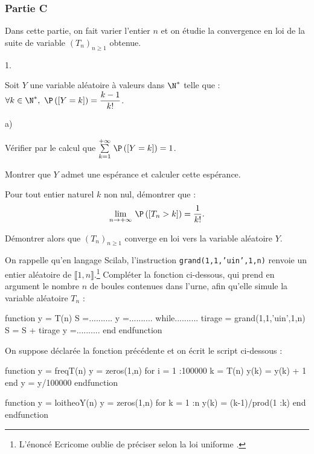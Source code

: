 \documentclass[11pt]{article}%
\begin{document}
{\subsubsection*{Partie C}

Dans cette partie, on fait varier l'entier $n$ et on étudie la
convergence en loi de la suite de variable $(T_{n})_{n\geq 1}$ obtenue.

\begin{noliste}{1.}
 \setlength{\itemsep}{4mm}
	\item Soit $Y$ une variable aléatoire à valeurs dans $\N^*$ telle que
: $\forall k\in\N^*,~ \P\left(\Ev{Y = k}\right) = \dfrac{k-1}{k!}$.
		\begin{noliste}{a)}
 \setlength{\itemsep}{2mm}
			\item Vérifier par le calcul que $\Sum{k = 1}{+ \infty}
\P\left(\Ev{Y = k}\right) = 1$.
			\item Montrer que $Y$ admet une espérance et calculer cette
espérance.
		\end{noliste}
	\item Pour tout entier naturel $k$ non nul, démontrer que :
		\[
\dlim{n\to + \infty} \P\left(\Ev{T_{n}>k}\right) = \dfrac1{k!}.
\]
	\item Démontrer alors que $(T_{n})_{n\geq 1}$ converge en loi vers la
variable aléatoire $Y$.
	\item On rappelle qu'en langage Scilab, l'instruction
\texttt{grand(1,1,'uin',1,n)} renvoie un entier aléatoire de
$\llbracket 1,n\rrbracket$.\footnote{L'énoncé Ecricome oublie de
préciser \og selon la loi uniforme \fg{}.} Compléter la fonction
ci-dessous, qui prend en argument le nombre $n$ de boules contenues
dans l'urne, afin qu'elle simule la variable aléatoire $T_{n}$ :
	
\begin{code}
function y = T(n)
 S =..........
 y =..........
 while..........
 tirage = grand(1,1,'uin',1,n)
 S = S + tirage
 y =..........
 end
endfunction
\end{code}
	
	\item On suppose déclarée la fonction précédente et on écrit le script
ci-dessous :
	
\begin{code}
function y = freqT(n)
 y = zeros(1,n)
 for i = 1 :100000
 k = T(n)
 y(k) = y(k) + 1
 end
 y = y/100000
endfunction

function y = loitheoY(n)
 y = zeros(1,n)
 for k = 1 :n
 y(k) = (k-1)/prod(1 :k)
 end
endfunction


\end{code}
\end{noliste}}
\end{document}
